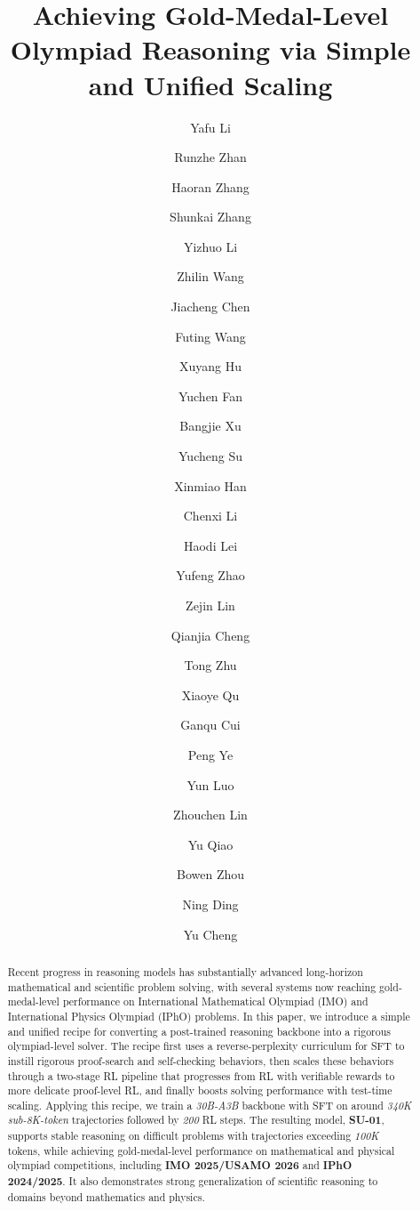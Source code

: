 \documentclass{llmxive}
\title{Achieving Gold-Medal-Level Olympiad Reasoning via Simple and Unified Scaling}
\author{Yafu Li \and Runzhe Zhan \and Haoran Zhang \and Shunkai Zhang \and Yizhuo Li \and Zhilin Wang \and Jiacheng Chen \and Futing Wang \and Xuyang Hu \and Yuchen Fan \and Bangjie Xu \and Yucheng Su \and Xinmiao Han \and Chenxi Li \and Haodi Lei \and Yufeng Zhao \and Zejin Lin \and Qianjia Cheng \and Tong Zhu \and Xiaoye Qu \and Ganqu Cui \and Peng Ye \and Yun Luo \and Zhouchen Lin \and Yu Qiao \and Bowen Zhou \and Ning Ding \and Yu Cheng}
\begin{document}
\maketitle
\begin{abstract}
Recent progress in reasoning models has substantially advanced long-horizon
mathematical and scientific problem solving, with several systems now reaching
gold-medal-level performance on International Mathematical Olympiad (IMO) and
International Physics Olympiad (IPhO) problems.
In this
paper, we introduce a simple and unified recipe for converting a post-trained
reasoning backbone into a rigorous olympiad-level solver. The recipe first uses
a reverse-perplexity curriculum for SFT to instill rigorous
proof-search and self-checking behaviors, then scales these behaviors through a
two-stage RL pipeline that progresses from RL with
verifiable rewards to more delicate proof-level RL, and finally boosts solving
performance with test-time scaling. 
Applying this recipe, we train a \textit{30B-A3B}
backbone with SFT on around \textit{340K sub-8K-token} trajectories followed by \textit{200} RL
steps. 
The resulting model, \textbf{SU-01}, supports
  stable reasoning on difficult problems with trajectories exceeding \textit{100K} tokens,
  while achieving gold-medal-level performance on mathematical and physical
  olympiad competitions, including \textbf{IMO 2025/USAMO 2026} and \textbf{IPhO 2024/2025}. 
  It also demonstrates strong generalization of scientific reasoning to domains beyond mathematics and physics.
\vspace{-0.5em}
\end{abstract}
\vspace{-1.45em}




\begin{center}
\vspace{-1em}

\captionsetup{type=figure,hypcap=false,skip=2pt}
\label{fig:proofbench-overall}
\end{center}
\end{document}
